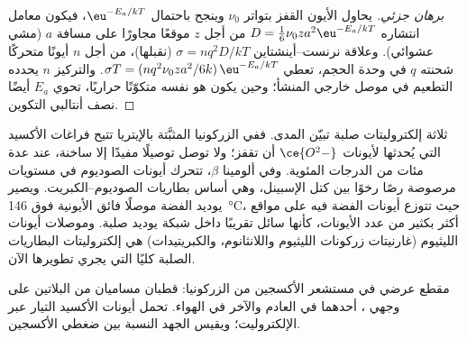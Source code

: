 \begin{proof}[برهان جزئي]
يحاول الأيون القفز بتواتر $\nu_0$ وينجح باحتمال $\eu^{-E_a/kT}$،
فيكون معامل انتشاره $D = \tfrac16\nu_0 z a^2\eu^{-E_a/kT}$ من أجل $z$ موقعًا مجاورًا على
مسافة $a$ (مشي عشوائي). وعلاقة نرنست--أينشتاين $\sigma = nq^2D/kT$ (نقبلها)، من أجل $n$
أيونًا متحركًا شحنته $q$ في وحدة الحجم، تعطي $\sigma T = (nq^2\nu_0za^2/6k)\,\eu^{-E_a/kT}$. 
والتركيز $n$ يحدده التطعيم في موصل خارجي المنشأ؛ وحين يكون
هو نفسه متكوّنًا حراريًا، تحوي $E_a$ أيضًا نصف أنتالبي التكوين.
\end{proof}

ثلاثة إلكتروليتات صلبة تبيّن المدى. ففي الزركونيا المثبَّتة بالإيتريا تتيح
فراغات الأكسيد التي يُحدثها  لأيونات $\ce{O^2-}$ أن تقفز؛ ولا توصل توصيلًا مفيدًا
إلا ساخنة، عند عدة مئات من الدرجات المئوية. وفي ألومينا $\beta$، تتحرك أيونات الصوديوم في
مستويات مرصوصة رصًا رخوًا بين كتل الإسبينل، وهي أساس بطاريات الصوديوم--الكبريت.
ويصير يوديد الفضة موصلًا فائق الأيونية فوق \qty{146}{\celsius}،
حيث تتوزع أيونات الفضة فيه على مواقع أكثر بكثير من عدد الأيونات،
كأنها سائل تقريبًا داخل شبكة يوديد صلبة. وموصلات أيونات الليثيوم
(غارنيتات زركونات الليثيوم واللانثانوم، والكبريتيدات) هي إلكتروليتات
البطاريات الصلبة كليًا التي يجري تطويرها الآن.

\begin{omfigure}

{\small مقطع عرضي في مستشعر الأكسجين من الزركونيا: قطبان مساميان من البلاتين
على وجهي ، أحدهما في العادم والآخر في الهواء.
تحمل أيونات الأكسيد التيار عبر الإلكتروليت؛ ويقيس الجهد
النسبة بين ضغطي الأكسجين.}
\end{omfigure}

